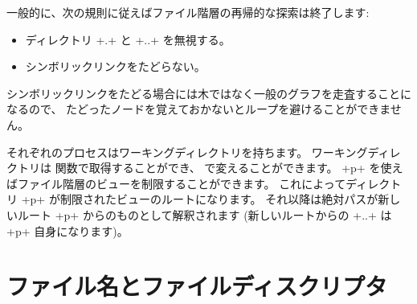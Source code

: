 一般的に、次の規則に従えばファイル階層の再帰的な探索は終了します:
%
\begin{itemize}
\item ディレクトリ \ml+.+ と \ml+..+ を無視する。
\item シンボリックリンクをたどらない。
\end{itemize}
%
シンボリックリンクをたどる場合には木ではなく一般のグラフを走査することになるので、
たどったノードを覚えておかないとループを避けることができません。

それぞれのプロセスはワーキングディレクトリを持ちます。
ワーキングディレクトリは  関数で取得することができ、
 で変えることができます。
 \ml+p+ を使えばファイル階層のビューを制限することができます。
これによってディレクトリ \ml+p+ が制限されたビューのルートになります。
それ以降は絶対パスが新しいルート \ml+p+ からのものとして解釈されます (新しいルートからの \ml+..+ は \ml+p+ 自身になります)。

\section{ファイル名とファイルディスクリプタ}

